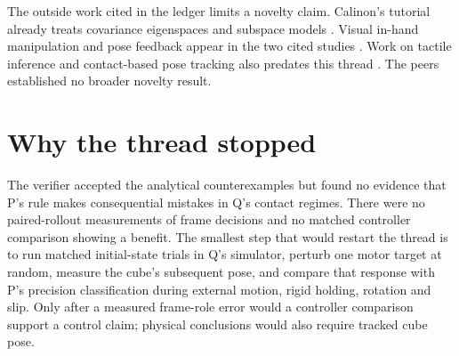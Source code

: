 \documentclass{article}
\begin{document}
The outside work cited in the ledger limits a novelty claim. Calinon's tutorial already treats covariance
eigenspaces and subspace models \cite{Calinon2015}. Visual in-hand manipulation and pose feedback appear
in the two cited studies \cite{VisualDexterity,HapticPose}. Work on tactile inference and contact-based
pose tracking also predates this thread \cite{TactileInference,ContactPose}. The peers established no
broader novelty result.

\section{Why the thread stopped}

The verifier accepted the analytical counterexamples but found no evidence that P's rule makes
consequential mistakes in Q's contact regimes. There were no paired-rollout measurements of frame
decisions and no matched controller comparison showing a benefit. The smallest step that would restart
the thread is to run matched initial-state trials in Q's simulator, perturb one motor target at random,
measure the cube's subsequent pose, and compare that response with P's precision classification during
external motion, rigid holding, rotation and slip. Only after a measured frame-role error would a
controller comparison support a control claim; physical conclusions would also require tracked cube pose.



\end{document}

